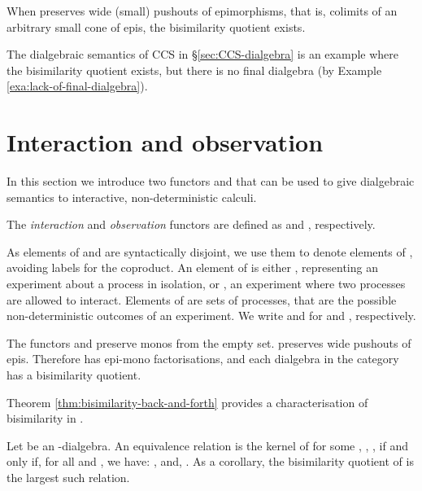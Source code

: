\documentclass[orivec]{llncs}
\newcommand{\defend}{}
\renewenvironment{definition}{\begin{defn}}{\defend\end{defn}}
\renewenvironment{theorem}{\begin{thm}}{\defend\end{thm}}
\begin{document}
\begin{proposition}\label{pro:existence-bisimilarity-quotients}
	When  preserves wide (small) pushouts of epimorphisms, that is, colimits of an arbitrary small cone of epis, the bisimilarity quotient exists.
\end{proposition}

The dialgebraic semantics of CCS in \S \ref{sec:CCS-dialgebra} is an example where the bisimilarity quotient exists, but there is no final dialgebra (by Example \ref{exa:lack-of-final-dialgebra}).

\section{Interaction and observation}
\label{sec:interaction-and-observation-functors}

In this section we introduce two functors  and  that can be used to give dialgebraic semantics to interactive, non-deterministic calculi.

\begin{definition}\label{def:int-and-obs-functors}
	The \emph{interaction} and \emph{observation} functors are defined as  and , respectively.
\end{definition}

As elements of  and  are syntactically disjoint, we use them to denote elements of , avoiding labels for the coproduct. An element of  is either , representing an experiment about a process in isolation, or , an experiment where two processes are allowed to interact. Elements of  are sets of processes, that are the possible non-deterministic outcomes of an experiment. We write  and  for  and , respectively.


\begin{proposition}\label{pro:int-obs-epi-mono-bisim-quotient}
	The functors  and  preserve monos from the empty set.  preserves wide pushouts of epis. Therefore  has epi-mono factorisations, and each dialgebra in the category has a bisimilarity quotient.
\end{proposition}

\noindent Theorem \ref{thm:bisimilarity-back-and-forth} provides a characterisation of bisimilarity in .


\begin{theorem}\label{thm:bisimilarity-back-and-forth}
 Let  be an -dialgebra. An equivalence relation  is the kernel of  for some , , , if and only if, for all  and , we have: , and, . As a corollary, the bisimilarity quotient of  is the largest such relation.
\end{theorem}
\end{document}

